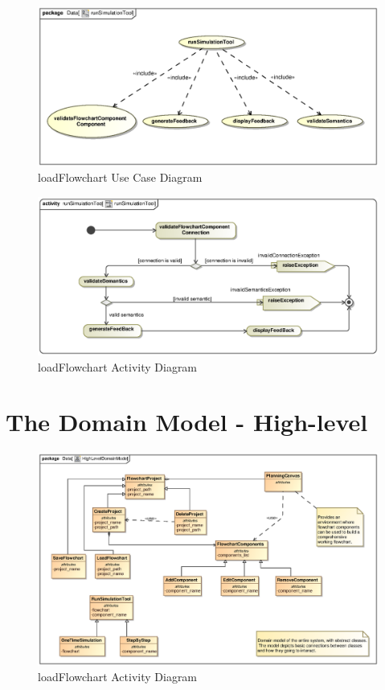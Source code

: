 \documentclass[11pt,a4paper,titlepage]{article}
\begin{document}
\begin{figure}[H]
  \centering
\includegraphics[width=500px]{runSimulationToolUseCase.eps}
\caption{loadFlowchart Use Case Diagram}
\end{figure}

\begin{figure}[H]
  \centering
\includegraphics[width=500px]{runSimulationToolActivity.eps}
\caption{loadFlowchart Activity Diagram}
\end{figure}

\newpage
\section{The Domain Model - High-level}
\begin{figure}[H]
  \centering
\includegraphics[width=500px]{HighLevelDomainModel.eps}
\caption{loadFlowchart Activity Diagram}
\end{figure}
\end{document}
